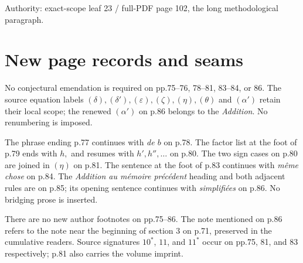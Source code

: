 \documentclass[11pt]{article}
\begin{document}
Authority: exact-scope leaf 23 / full-PDF page 102, the long methodological paragraph.

\section*{New page records and seams}
No conjectural emendation is required on pp.75–76, 78–81, 83–84, or 86. The
source equation labels $(\delta),(\delta'),(\varepsilon),(\zeta),(\eta),(\theta)$ and
$(\alpha')$ retain their local scope; the renewed $(\alpha')$ on p.86 belongs to the
\emph{Addition}. No renumbering is imposed.

The phrase ending p.77 continues with \emph{de $b$} on p.78. The factor list at
the foot of p.79 ends with $h,$ and resumes with $h',h'',\ldots$ on p.80.
The two sign cases on p.80 are joined in $(\eta)$ on p.81. The sentence at the
foot of p.83 continues with \emph{même chose} on p.84. The \emph{Addition au mémoire
précédent} heading and both adjacent rules are on p.85; its opening sentence
continues with \emph{simplifiées} on p.86. No bridging prose is inserted.

There are no new author footnotes on pp.75–86. The note mentioned on p.86
refers to the note near the beginning of section 3 on p.71, preserved in the
cumulative readers. Source signatures $10^*$, $11$, and $11^*$ occur on
pp.75, 81, and 83 respectively; p.81 also carries the volume imprint.
\end{document}
